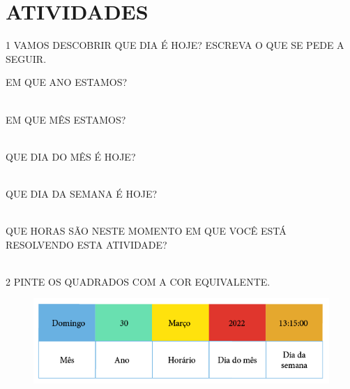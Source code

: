 \pagebreak
\section*{ATIVIDADES}

\num{1} VAMOS DESCOBRIR QUE DIA É HOJE? ESCREVA O QUE SE PEDE A SEGUIR.

\begin{escolha}
\item EM QUE ANO ESTAMOS?\\\\

\item EM QUE MÊS ESTAMOS?\\\\

\item QUE DIA DO MÊS É HOJE?\\\\

\item QUE DIA DA SEMANA É HOJE?\\\\

\item QUE HORAS SÃO NESTE MOMENTO EM QUE VOCÊ ESTÁ RESOLVENDO ESTA ATIVIDADE?\\\\
\end{escolha}



\num{2} PINTE OS QUADRADOS COM A COR EQUIVALENTE.

\begin{figure}[htpb!]
\centering
\includegraphics[width=\textwidth]{./media/SAEB_1ANO_MAT_FIGURA49.png}
\end{figure}

